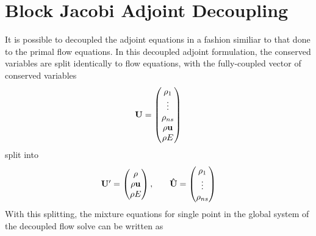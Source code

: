 \section{Block Jacobi Adjoint Decoupling}

It is possible to decoupled the adjoint equations in a fashion similiar to that
done to the primal flow equations.  In this decoupled adjoint formulation, the
conserved variables are split identically to flow equations, with the
fully-coupled vector of conserved variables
\begin{equation}
	\mathbf U =
  \begin{pmatrix}
 		\rho_1    \\
		\vdots    \\
		\rho_{ns} \\
    \rho \mathbf u  \\
		\rho E    \\
	\end{pmatrix}
  \label{all-vars}
 \end{equation}
 split into
\begin{equation}
	\begin{matrix}
		\mathbf{U}'=\begin{pmatrix}
			\rho \\
			\rho \mathbf u \\
			\rho E
		\end{pmatrix},\quad &
		\mathbf{\hat{U}}=\begin{pmatrix}
			\rho_1 \\
			\vdots \\
			\rho_{ns}
		\end{pmatrix}
	\end{matrix}
  \label{dc-vars}
\end{equation}
With this splitting, the mixture equations for single point in the global system
of the decoupled flow solve can be written as
